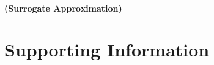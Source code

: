 \documentclass[10pt,letterpaper]{article}
\begin{document}
\paragraph{(Surrogate Approximation)}





\section*{Supporting Information}

%
%
%
%
\end{document}
